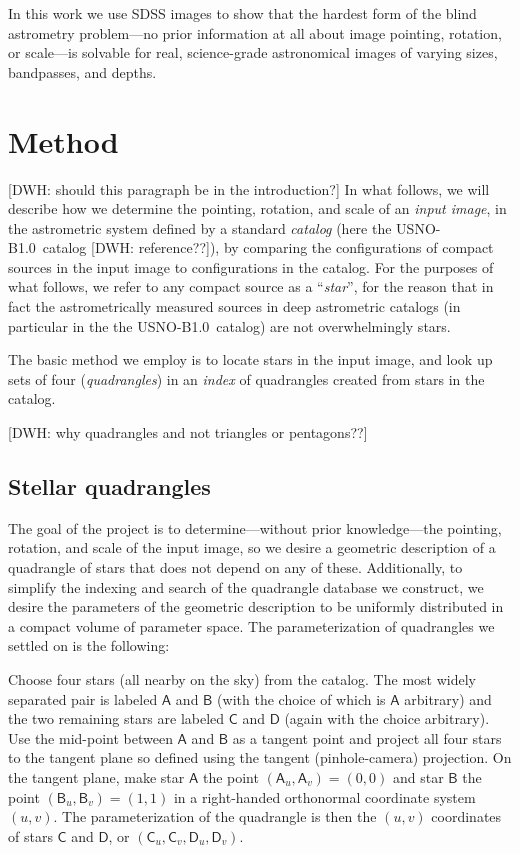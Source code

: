 \documentclass[12pt,preprint]{aastex}
\newcommand{\usnob}{USNO-B1.0}
\newcommand{\starlabel}[1]{\mathsf{#1}}
\newcommand{\AAA}{\starlabel{A}}
\newcommand{\BBB}{\starlabel{B}}
\newcommand{\CCC}{\starlabel{C}}
\newcommand{\DDD}{\starlabel{D}}
\begin{document}
In this work we use SDSS images to show that the hardest form of the
blind astrometry problem---no prior information at all about image
pointing, rotation, or scale---is solvable for real, science-grade
astronomical images of varying sizes, bandpasses, and depths.

\section{Method}

[DWH: should this paragraph be in the introduction?]  In what follows,
we will describe how we determine the pointing, rotation, and scale of
an \textit{input image}, in the astrometric system defined by a
standard \textit{catalog} (here the \usnob\ catalog [DWH:
reference??]), by comparing the configurations of compact sources in
the input image to configurations in the catalog.  For the purposes of
what follows, we refer to any compact source as a ``\textit{star}'',
for the reason that in fact the astrometrically measured sources in
deep astrometric catalogs (in particular in the the \usnob\ catalog)
are not overwhelmingly stars.

The basic method we employ is to locate stars in the input image, and
look up sets of four (\textit{quadrangles}) in an \textit{index} of
quadrangles created from stars in the catalog.

[DWH: why quadrangles and not triangles or pentagons??]

\subsection{Stellar quadrangles}

The goal of the project is to determine---without prior
knowledge---the pointing, rotation, and scale of the input image, so
we desire a geometric description of a quadrangle of stars that does
not depend on any of these.  Additionally, to simplify the indexing
and search of the quadrangle database we construct, we desire the
parameters of the geometric description to be uniformly distributed in
a compact volume of parameter space.  The parameterization of
quadrangles we settled on is the following:

Choose four stars (all nearby on the sky) from the catalog.  The most
widely separated pair is labeled $\AAA$ and $\BBB$ (with the choice of
which is $\AAA$ arbitrary) and the two remaining stars are labeled
$\CCC$ and $\DDD$ (again with the choice arbitrary).  Use the
mid-point between $\AAA$ and $\BBB$ as a tangent point and project all
four stars to the tangent plane so defined using the tangent
(pinhole-camera) projection.  On the tangent plane, make star $\AAA$
the point $(\AAA_u,\AAA_v)=(0,0)$ and star $\BBB$ the point
$(\BBB_u,\BBB_v)=(1,1)$ in a right-handed orthonormal coordinate
system $(u,v)$.  The parameterization of the quadrangle is then the
$(u,v)$ coordinates of stars $\CCC$ and $\DDD$, or
$(\CCC_u,\CCC_v,\DDD_u,\DDD_v)$.
\end{document}
